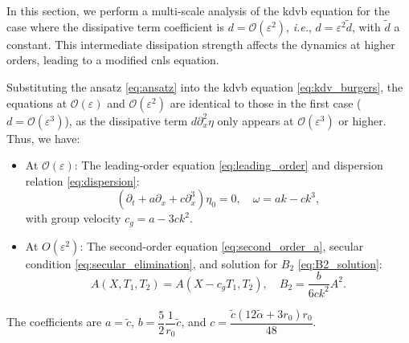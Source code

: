 \documentclass[alpha-refs, 12pt]{wiley-article}
\renewcommand{\O}{\mathcal{O}}
\newcommand{\eps}{\varepsilon}
\begin{document}
In this section, we perform a multi-scale analysis of the \acrshort{kdvb} equation for the case where the dissipative term coefficient is $d = \O(\eps^2)$, \emph{i.e.}, $d = \eps^2 \tilde{d}$, with $\tilde{d}$ a constant. This intermediate dissipation strength affects the dynamics at higher orders, leading to a modified \acrfull{cnls} equation.

Substituting the ansatz \eqref{eq:ansatz} into the \acrshort{kdvb} equation \eqref{eq:kdv_burgers}, the equations at $\O(\eps)$ and $\O(\eps^2)$ are identical to those in the first case ($d = \O(\eps^3)$), as the dissipative term $d \partial_x^2 \eta$ only appears at $\O(\eps^3)$ or higher. Thus, we have:
\begin{itemize}
    \item At $\O(\eps)$: The leading-order equation \eqref{eq:leading_order} and dispersion relation \eqref{eq:dispersion}:
    \[
    \left( \partial_t + a \partial_x + c \partial_x^3 \right) \eta_0 = 0, \quad \omega = a k - c k^3,
    \]
    with group velocity $c_g = a - 3 c k^2$.
    \item At $O(\eps^2)$: The second-order equation \eqref{eq:second_order_a}, secular condition \eqref{eq:secular_elimination}, and solution for $B_2$ \eqref{eq:B2_solution}:
    \[
    A(X, T_1, T_2) = A(X - c_g T_1, T_2), \quad B_2 = \frac{b}{6 c k^2} A^2.
    \]
\end{itemize}
The coefficients are $a = \tilde{c}$, $b = \dfrac{5}{2} \dfrac{1}{r_0} \tilde{c}$, and $c = \dfrac{\tilde{c} (12 \tilde{\alpha} + 3 r_0) r_0}{48}$.
\end{document}
